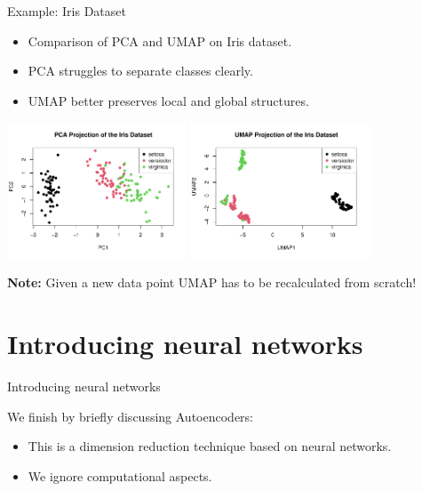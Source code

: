 \documentclass[11pt,handout,aspectratio=169]{beamer}
\begin{document}
\begin{frame}{Example: Iris Dataset}
\begin{itemize}
    \item Comparison of PCA and UMAP on Iris dataset.
    \item PCA struggles to separate classes clearly.
    \item UMAP better preserves local and global structures.
\end{itemize}
\begin{center}
    \includegraphics[width=0.4\textwidth]{pics/iris_pca.pdf}
    \includegraphics[width=0.4\textwidth]{pics/iris_umap.pdf}
\end{center}
\alert{\textbf{Note:}} Given a new data point UMAP has to be recalculated from scratch!
\end{frame}


\section{Introducing neural networks}

\begin{frame}{}
	\begin{center}
		\alert{\Huge Introducing neural networks}
	\end{center}
	\vspace{1cm}
	We finish by briefly discussing Autoencoders:
	\begin{itemize}
		\item This is a dimension reduction technique based on neural networks.
		\item We ignore computational aspects. 
	\end{itemize}
\end{frame}
\end{document}

